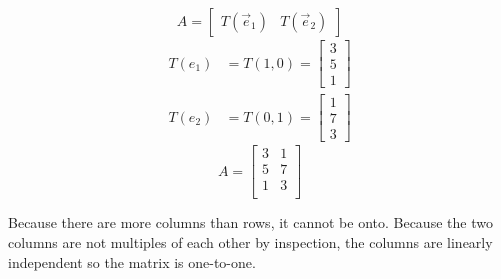\documentclass[12pt]{article} %
\begin{document}
$$A = \begin{bmatrix}
	T(\vec{e}_1) & T(\vec{e}_2)
\end{bmatrix}$$
\begin{align*}
	T(e_1) &= T(1, 0) = \begin{bmatrix}
		3\\5\\1
	\end{bmatrix}\\
	T(e_2) &= T(0, 1) = \begin{bmatrix}
		1\\7\\3
	\end{bmatrix}
\end{align*} 
$$A = \begin{bmatrix}
		3 & 1\\
		5 & 7\\
		1 & 3\\
	\end{bmatrix}$$

Because there are more columns than rows, it cannot be onto.
Because the two columns are not multiples of each other by inspection, the columns are linearly independent so the matrix is one-to-one.
\end{document}
